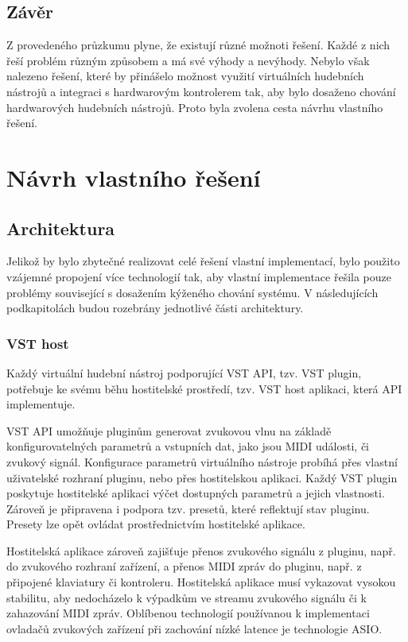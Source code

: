 \documentclass[thesis=M,czech]{FITthesis}[2019/03/06]
\begin{document}
	\section{Závěr}
		Z provedeného průzkumu plyne, že existují různé možnoti řešení. Každé z nich řeší problém různým způsobem a má své výhody a nevýhody.
		Nebylo však nalezeno řešení, které by přinášelo možnost využití virtuálních hudebních nástrojů a integraci s hardwarovým kontrolerem tak,
		aby bylo dosaženo chování hardwarových hudebních nástrojů. Proto byla zvolena cesta návrhu vlastního řešení.

\chapter{Návrh vlastního řešení}
	\section{Architektura}
		Jelikož by bylo zbytečné realizovat celé řešení vlastní implementací, bylo použito vzájemné propojení více technologií tak,
		aby vlastní implementace řešila pouze problémy související s dosažením kýženého chování systému. V následujících podkapitolách
		budou rozebrány jednotlivé části architektury.
		
		\subsection{VST host}
			Každý virtuální hudební nástroj podporující VST API\cite{vstdoc}, tzv. VST plugin, potřebuje ke svému běhu hostitelské prostředí, tzv. VST host aplikaci, která API implementuje.
			
			VST API\cite{vstdoc} umožňuje pluginům generovat zvukovou vlnu na základě konfigurovatelných
			parametrů a vstupních dat, jako jsou MIDI události\cite{midi}, či zvukový signál.
			Konfigurace parametrů virtuálního nástroje probíhá přes vlastní uživatelské rozhraní pluginu, nebo přes hostitelskou aplikaci.
			Každý VST plugin poskytuje hostitelské aplikaci výčet dostupných parametrů a jejich vlastnosti.
			Zároveň je připravena i podpora tzv. presetů, které reflektují stav pluginu. Presety lze opět ovládat prostřednictvím
			hostitelské aplikace.
			
			Hostitelská aplikace zároveň zajišťuje přenos zvukového signálu z pluginu, např. do zvukového rozhraní zařízení,
			a přenos MIDI zpráv do pluginu, např. z připojené klaviatury či kontroleru. Hostitelská aplikace musí vykazovat
			vysokou stabilitu, aby nedocházelo k výpadkům ve streamu zvukového signálu či k zahazování MIDI zpráv. Oblíbenou 
			technologií používanou k implementaci ovladačů zvukových zařízení při zachování nízké latence je technologie ASIO\cite{asio}.
			
\end{document}
